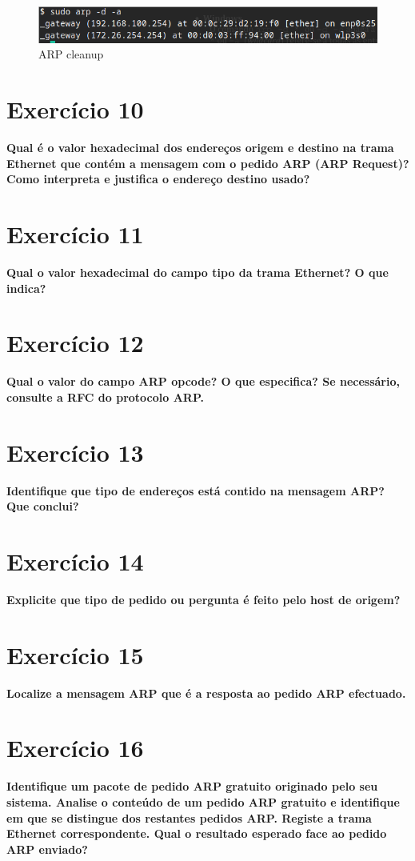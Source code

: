 \documentclass[a4paper]{report}
\begin{document}
\begin{figure}[H]
    \centering 
    \includegraphics[width=\textwidth]{images/arpCleanup.png}
    \caption{ARP cleanup}
    \label{fig:arpCleanup}
\end{figure}


\section{Exercício 10}
\textbf{Qual é o valor hexadecimal dos endereços origem e destino na trama
Ethernet que contém a mensagem com o pedido ARP (ARP Request)? Como interpreta e
justifica o endereço destino usado?}


\section{Exercício 11}
\textbf{Qual o valor hexadecimal do campo tipo da trama Ethernet? O que indica?}


\section{Exercício 12}
\textbf{Qual o valor do campo ARP opcode? O que especifica?  Se necessário,
consulte a RFC do protocolo ARP.}


\section{Exercício 13}
\textbf{Identifique que tipo de endereços está contido na mensagem ARP? Que
conclui?}


\section{Exercício 14}
\textbf{Explicite que tipo de pedido ou pergunta é feito pelo host de origem?}


\section{Exercício 15}
\textbf{Localize a mensagem ARP que é a resposta ao pedido ARP efectuado.}


\section{Exercício 16}
\textbf{Identifique um pacote de pedido ARP gratuito originado pelo seu sistema.
Analise o conteúdo de um pedido ARP gratuito e identifique em que se distingue
dos restantes pedidos ARP. Registe a trama Ethernet correspondente. Qual o
resultado esperado face ao pedido ARP enviado?}
\end{document}
